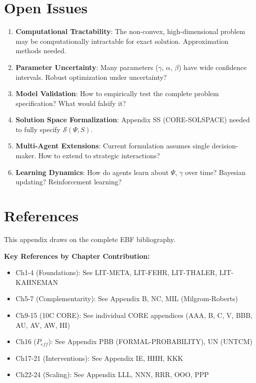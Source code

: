 \section{Open Issues}
\label{sec:mp-open-issues}

\begin{enumerate}
\item \textbf{Computational Tractability}: The non-convex, high-dimensional
      problem may be computationally intractable for exact solution.
      Approximation methods needed.

\item \textbf{Parameter Uncertainty}: Many parameters ($\gamma$, $\alpha$, $\beta$)
      have wide confidence intervals. Robust optimization under uncertainty?

\item \textbf{Model Validation}: How to empirically test the complete problem
      specification? What would falsify it?

\item \textbf{Solution Space Formalization}: Appendix SS (CORE-SOLSPACE)
      needed to fully specify $\mathcal{S}(\Psi, S)$.

\item \textbf{Multi-Agent Extensions}: Current formulation assumes single
      decision-maker. How to extend to strategic interactions?

\item \textbf{Learning Dynamics}: How do agents learn about $\Psi$, $\gamma$
      over time? Bayesian updating? Reinforcement learning?
\end{enumerate}

\section{References}
\label{sec:mp-references}

This appendix draws on the complete EBF bibliography.

\nocite{bcm_master}

\textbf{Key References by Chapter Contribution:}

\begin{itemize}[nosep]
\item Ch1-4 (Foundations): See LIT-META, LIT-FEHR, LIT-THALER, LIT-KAHNEMAN
\item Ch5-7 (Complementarity): See Appendix B, NC, MIL (Milgrom-Roberts)
\item Ch9-15 (10C CORE): See individual CORE appendices (AAA, B, C, V, BBB, AU, AV, AW, HI)
\item Ch16 ($P_{eff}$): See Appendix PBB (FORMAL-PROBABILITY), UN (UNTCM)
\item Ch17-21 (Interventions): See Appendix IE, HHH, KKK
\item Ch22-24 (Scaling): See Appendix LLL, NNN, RRR, OOO, PPP
\end{itemize}

